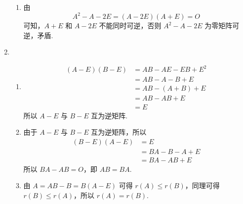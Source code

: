\begin{enumerate}
\begin{enumerate}
              \item 由
                    \[  A^2 - A - 2E = (A - 2E)(A + E) = O \]
                    可知，$ A + E $ 和 $ A - 2E $ 不能同时可逆，否则 $ A^2 - A - 2E $ 为零矩阵可逆，矛盾.
          \end{enumerate}

    \item \begin{enumerate}
              \item \begin{align*}
                        (A - E)(B - E) & = AB - AE - EB + E^2 \\
                                       & = AB - A - B + E     \\
                                       & = AB - (A + B) + E   \\
                                       & = AB - AB + E        \\
                                       & = E
                    \end{align*}
                    所以 $ A - E $ 与 $ B - E $ 互为逆矩阵.

              \item 由于 $ A - E $ 与 $ B - E $ 互为逆矩阵，所以
                    \begin{align*}
                        (B - E)(A - E) & = E              \\
                                       & = BA - B - A + E \\
                                       & = BA - AB + E
                    \end{align*}
                    所以 $ BA - AB = O $，即 $ AB = BA $.

              \item 由 $ A = AB - B = B(A - E) $ 可得 $ r(A) \leqslant r(B) $，同理可得 $ r(B) \leqslant r(A) $，所以 $ r(A) = r(B) $.
          \end{enumerate}
\end{enumerate}

